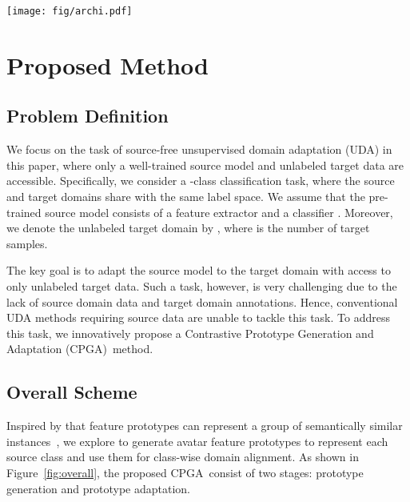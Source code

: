 \documentclass{article}
\def\ournet{CPGA}
\begin{document}
\begin{figure*}[h]
\centering
\texttt{[image: fig/archi.pdf]}
\vspace{-0.07in}
\caption{An overview of \ournet. \ournet~contains two stages: (1) \textbf{Prototype generation}: under the guidance of the fixed classifier, a generator  is trained to generate avatar feature prototypes via  and . (2) \textbf{Prototype adaptation}:  in each training batch, we use the learned prototype generator to generate one prototype for each class. Based on the generated prototypes and pseudo labels obtained by clustering, we align each pseudo-labeled target feature to the corresponding class prototype by training a domain-invariant feature extractor via ,  and . Note that the classifier  is fixed during the whole training phase.}
\label{fig:overall}
\vspace{-0.05in}
\end{figure*}


\section{Proposed Method}
\subsection{Problem Definition}
We focus on the task of source-free unsupervised domain adaptation (UDA) in this paper, where only a well-trained source model and unlabeled target data are accessible.
Specifically, we consider a -class classification task, where the source and target domains share with the same label space. We assume that the pre-trained source model consists of a feature extractor  and a classifier .  Moreover, we denote the unlabeled target domain by , where  is the number of target samples.

The key goal is to adapt the source model to the target domain with access to only unlabeled target data. Such a task, however, is very challenging due to 
the lack of source domain data and target domain annotations. Hence, conventional UDA methods requiring source data are unable to tackle this task. To address this task, we innovatively propose a Contrastive Prototype Generation and Adaptation (\ournet)~method.



\subsection{Overall Scheme}
Inspired by that feature prototypes can represent a group of semantically similar instances~\cite{snell2017prototypical}, we explore to generate avatar feature prototypes to represent each source class and use them for class-wise domain alignment. 
As shown in Figure~\ref{fig:overall}, the proposed \ournet~consist of two stages: prototype generation and prototype adaptation.
\end{document}
